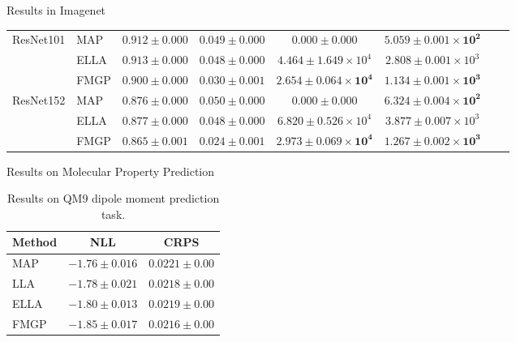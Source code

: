 \documentclass[aspectratio=149]{beamer}
\begin{document}
\begin{frame}{Results in Imagenet}
\begin{table}[ht]
{\begin{tabular}{llcccccc}
        \hline
        \multirow{3}{*}{ResNet101} & MAP & {\color{teal}$\mathbf{0.912 \pm 0.000}$} & $0.049 \pm 0.000$ & {\color{purple}$\mathbf{0.000 \pm 0.000}$} & {\color{purple}$\mathbf{5.059 \pm 0.001 \times 10^2}$} \\
        & ELLA & $0.913 \pm 0.000$ & {\color{teal}$\mathbf{0.048 \pm 0.000}$} & $4.464 \pm 1.649 \times 10^4$ & $2.808 \pm 0.001 \times 10^3$ \\
        & FMGP & {\color{purple}$\mathbf{0.900 \pm 0.000}$} & {\color{purple}$\mathbf{0.030 \pm 0.001}$} & {\color{teal}$\mathbf{2.654 \pm 0.064 \times 10^4}$} & {\color{teal}$\mathbf{1.134 \pm 0.001 \times 10^3}$} \\
        \hline
        \multirow{3}{*}{ResNet152} & MAP & {\color{teal}$\mathbf{0.876 \pm 0.000}$} & $0.050 \pm 0.000$ & {\color{purple}$\mathbf{0.000 \pm 0.000}$} & {\color{purple}$\mathbf{6.324 \pm 0.004 \times 10^2}$} \\
        & ELLA & $0.877 \pm 0.000$ & {\color{teal}$\mathbf{0.048 \pm 0.000}$} & $6.820 \pm 0.526 \times 10^4$ & $3.877 \pm 0.007 \times 10^3$ \\
        & FMGP & {\color{purple}$\mathbf{0.865 \pm 0.001}$} & {\color{purple}$\mathbf{0.024 \pm 0.001}$} & {\color{teal}$\mathbf{2.973 \pm 0.069 \times 10^4}$} & {\color{teal}$\mathbf{1.267 \pm 0.002 \times 10^3}$} \\
        \hline
    \end{tabular}}
\end{table}
        
    \end{frame}

    \begin{frame}{Results on Molecular Property Prediction}
        \begin{table}[]
        \centering
        \begin{tabular}{lcc}
        \hline
        \textbf{Method} & \textbf{NLL} & \textbf{CRPS} \\\hline
        MAP & \(-1.76 \pm 0.016\) & \(0.0221 \pm 0.00\) \\    
        LLA & \(-1.78 \pm 0.021\) & {\color{teal}$\mathbf{0.0218 \pm 0.00}$}  \\
        ELLA & {\color{teal}$\mathbf{-1.80 \pm 0.013}$}  & $0.0219 \pm 0.00$ \\
        FMGP & {\color{purple}$\mathbf{-1.85 \pm 0.017}$} & {\color{purple}$\mathbf{0.0216 \pm 0.00}$} \\
        \hline
        \end{tabular}
        \caption{Results on QM9 dipole moment prediction task.}
        \label{tab:qm9}
        \end{table}
    \end{frame}
\end{document}
